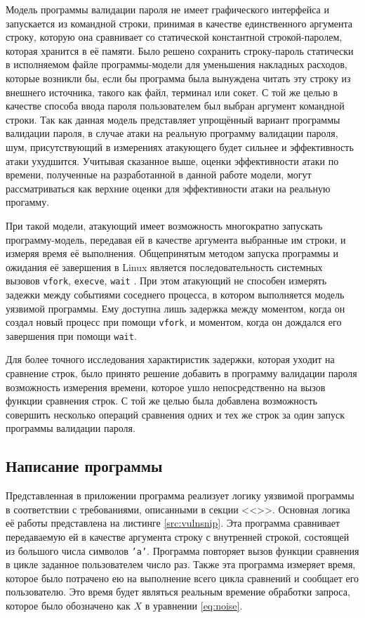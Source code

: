 Модель программы валидации пароля не имеет графического интерфейса и запускается
из командной строки, принимая в качестве единственного аргумента строку, которую
она сравнивает со статической константной строкой-паролем, которая хранится в
её памяти. Было решено сохранить строку-пароль статически в исполняемом файле
программы-модели для уменьшения накладных расходов, которые возникли
бы, если бы программа была вынуждена читать эту строку из внешнего источника,
такого как файл, терминал или сокет. С той же целью в качестве способа ввода
пароля пользователем был выбран аргумент командной строки. Так как данная модель
представляет упрощённый вариант программы валидации пароля, в случае атаки на
реальную программу валидации пароля, шум, присутствующий в измерениях атакующего
будет сильнее и эффективность атаки ухудшится. Учитывая сказанное выше,
оценки эффективности атаки по времени, полученные на разработанной в данной
работе модели, могут рассматриваться как верхние оценки для эффективности атаки
на реальную прогамму.

При такой модели, атакующий имеет возможность многократно запускать
программу-модель, передавая ей в качестве аргумента выбранные им строки, и
измеряя время её выполнения. Общепринятым методом запуска программы
и ожидания её завершения в Linux является последовательность системных вызовов
\texttt{vfork}, \texttt{execve}, \texttt{wait} \cite{kerrisk}. При этом
атакующий не способен измерять задежки между событиями соседнего процесса, в
котором выполняется модель уязвимой программы. Ему доступна лишь задержка между
моментом, когда он создал новый процесс при помощи \texttt{vfork}, и моментом,
когда он дождался его завершения при помощи \texttt{wait}.

Для более точного исследования характиристик задержки, которая уходит на
сравнение строк, было принято решение добавить в программу валидации пароля
возможность измерения времени, которое ушло непосредственно на вызов функции
сравнения строк. С той же целью была добавлена возможность совершить несколько
операций сравнения одних и тех же строк за один запуск программы валидации
пароля.

\subsection{Написание программы}

Представленная в приложении  программа реализует логику
уязвимой программы в соответствии с требованиями, описанными в секции
<<>>. Основная логика её работы представлена на листинге
\ref{src:vulnsnip}. Эта программа сравнивает передаваемую ей в качестве
аргумента строку с внутренней строкой, состоящей из большого числа символов
\texttt{'a'}. Программа повторяет вызов функции сравнения в цикле заданное
пользователем число раз. Также эта программа измеряет время, которое было
потрачено ею на выполнение всего цикла сравнений и сообщает его пользователю.
Это время будет являться реальным времение обработки запроса, которое было
обозначено как $X$ в уравнении \ref{eq:noise}.

